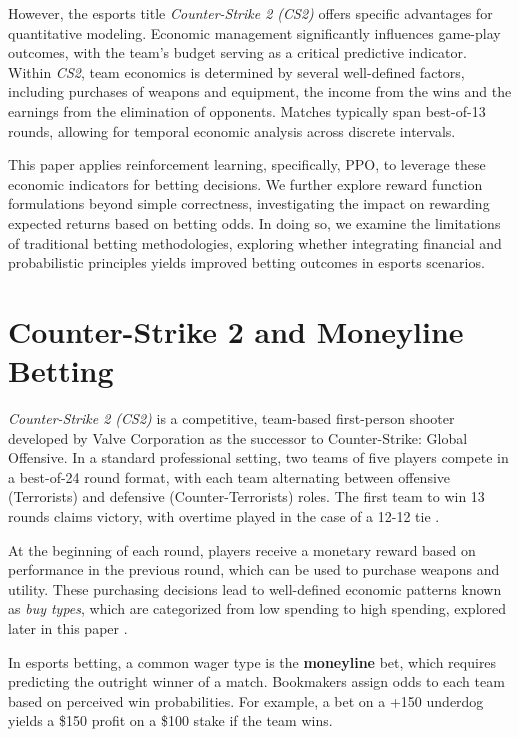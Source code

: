 \documentclass[sigconf]{acmart}
\begin{document}
However, the esports title \textit{Counter-Strike 2 (CS2)} offers specific advantages for quantitative modeling. Economic management significantly influences game-play outcomes, with the team's budget serving as a critical predictive indicator. Within \textit{CS2}, team economics is determined by several well-defined factors, including purchases of weapons and equipment, the income from the wins and the earnings from the elimination of opponents. Matches typically span best-of-13 rounds, allowing for temporal economic analysis across discrete intervals.


This paper applies reinforcement learning, specifically, PPO, to leverage these economic indicators for betting decisions. We further explore reward function formulations beyond simple correctness, investigating the impact on rewarding expected returns based on betting odds. In doing so, we examine the limitations of traditional betting methodologies, exploring whether integrating financial and probabilistic principles yields improved betting outcomes in esports scenarios.

\section{Counter-Strike 2 and Moneyline Betting}

\textit{Counter-Strike 2 (CS2)} is a competitive, team-based first-person shooter developed by Valve Corporation as the successor to Counter-Strike: Global Offensive. In a standard professional setting, two teams of five players compete in a best-of-24 round format, with each team alternating between offensive (Terrorists) and defensive (Counter-Terrorists) roles. The first team to win 13 rounds claims victory, with overtime played in the case of a 12-12 tie \cite{cs2competitivewiki}.

At the beginning of each round, players receive a monetary reward based on performance in the previous round, which can be used to purchase weapons and utility. These purchasing decisions lead to well-defined economic patterns known as \textit{buy types}, which are categorized from low spending to high spending, explored later in this paper \cite{cs2moneywiki}.

In esports betting, a common wager type is the \textbf{moneyline} bet, which requires predicting the outright winner of a match. Bookmakers assign odds to each team based on perceived win probabilities. For example, a bet on a +150 underdog yields a \$150 profit on a \$100 stake if the team wins.
\end{document}
